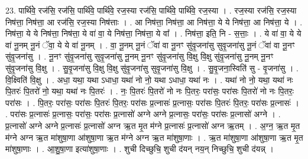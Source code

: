 \documentclass[17pt]{extarticle}
\begin{document}
23. पार्थि॑वे॒ रज॑सि॒ रज॑सि॒ पार्थि॑वे॒ पार्थि॑वे॒ रज॒स्या रज॑सि॒ पार्थि॑वे॒ पार्थि॑वे॒ रज॒स्या । . रज॒स्या रज॑सि॒ रज॒स्या निष॑त्ता॒ निष॑त्ता॒ आ रज॑सि॒ रज॒स्या निष॑त्ताः । . आ निष॑त्ता॒ निष॑त्ता॒ आ निष॑त्ता॒ ये ये निष॑त्ता॒ आ निष॑त्ता॒ ये । . निष॑त्ता॒ ये ये निष॑त्ता॒ निष॑त्ता॒ ये वा॑ वा॒ ये निष॑त्ता॒ निष॑त्ता॒ ये वा᳚ । . निष॑त्ता॒ इति॒ नि - स॒त्ताः॒ । . ये वा॑ वा॒ ये ये वा॑ नू॒नम् नू॒नं ॅवा॒ ये ये वा॑ नू॒नम् । . वा॒ नू॒नम् नू॒नं ॅवा॑ वा नू॒नꣳ सु॑वृ॒जना॑सु सुवृ॒जना॑सु नू॒नं ॅवा॑ वा नू॒नꣳ सु॑वृ॒जना॑सु । . नू॒नꣳ सु॑वृ॒जना॑सु सुवृ॒जना॑सु नू॒नम् नू॒नꣳ सु॑वृ॒जना॑सु वि॒क्षु वि॒क्षु सु॑वृ॒जना॑सु नू॒नम् नू॒नꣳ सु॑वृ॒जना॑सु वि॒क्षु । . सु॒वृ॒जना॑सु वि॒क्षु वि॒क्षु सु॑वृ॒जना॑सु सुवृ॒जना॑सु वि॒क्षु । . सु॒वृ॒जना॒स्विति॑ सु - वृ॒जना॑सु । . वि॒क्ष्विति॑ वि॒क्षु । . अधा॒ यथा॒ यथा ऽधाधा॒ यथा॑ नो नो॒ यथा ऽधाधा॒ यथा॑ नः । . यथा॑ नो नो॒ यथा॒ यथा॑ नः पि॒तरः॑ पि॒तरो॑ नो॒ यथा॒ यथा॑ नः पि॒तरः॑ । . नः॒ पि॒तरः॑ पि॒तरो॑ नो नः पि॒तरः॒ परा॑सः॒ परा॑सः पि॒तरो॑ नो नः पि॒तरः॒ परा॑सः । . पि॒तरः॒ परा॑सः॒ परा॑सः पि॒तरः॑ पि॒तरः॒ परा॑सः प्र॒त्नासः॑ प्र॒त्नासः॒ परा॑सः पि॒तरः॑ पि॒तरः॒ परा॑सः प्र॒त्नासः॑ । . परा॑सः प्र॒त्नासः॑ प्र॒त्नासः॒ परा॑सः॒ परा॑सः प्र॒त्नासो॑ अग्ने अग्ने प्र॒त्नासः॒ परा॑सः॒ परा॑सः प्र॒त्नासो॑ अग्ने । . प्र॒त्नासो॑ अग्ने अग्ने प्र॒त्नासः॑ प्र॒त्नासो॑ अग्न ऋ॒त मृ॒त म॑ग्ने प्र॒त्नासः॑ प्र॒त्नासो॑ अग्न ऋ॒तम् । . अ॒ग्न॒ ऋ॒त मृ॒त म॑ग्ने अग्न ऋ॒त मा॑शुषा॒णा आ॑शुषा॒णा ऋ॒त म॑ग्ने अग्न ऋ॒त मा॑शुषा॒णाः । . ऋ॒त मा॑शुषा॒णा आ॑शुषा॒णा ऋ॒त मृ॒त मा॑शुषा॒णाः । . आ॒शु॒षा॒णा इत्या॑शुषा॒णाः । . शुची दिच्छुचि॒ शुची द॑यन् नय॒न् निच्छुचि॒ शुची द॑यन्न् । \newline
\end{document}
